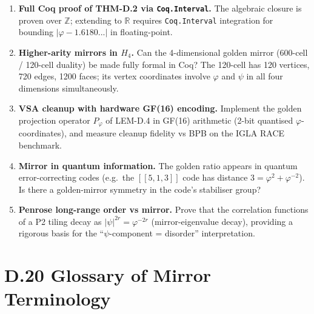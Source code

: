 \begin{enumerate}
  \item \textbf{Full Coq proof of THM-D.2 via \texttt{Coq.Interval}.}
    The algebraic closure is proven over $\mathbb{Z}$; extending to
    $\mathbb{R}$ requires \texttt{Coq.Interval} integration for bounding
    $|\varphi - 1.6180...|$ in floating-point.

  \item \textbf{Higher-arity mirrors in $H_4$.}
    Can the 4-dimensional golden mirror (600-cell / 120-cell duality)
    be made fully formal in Coq?  The 120-cell has 120 vertices, 720 edges,
    1200 faces; its vertex coordinates involve $\varphi$ and $\psi$ in all
    four dimensions simultaneously.

  \item \textbf{VSA cleanup with hardware GF(16) encoding.}
    Implement the golden projection operator $P_\varphi$ of LEM-D.4 in
    GF(16) arithmetic (2-bit quantised $\varphi$-coordinates), and measure
    cleanup fidelity vs BPB on the IGLA RACE benchmark.

  \item \textbf{Mirror in quantum information.}
    The golden ratio appears in quantum error-correcting codes (e.g.\ the
    $[[5,1,3]]$ code has distance $3 = \varphi^2+\varphi^{-2}$).
    Is there a golden-mirror symmetry in the code's stabiliser group?

  \item \textbf{Penrose long-range order vs mirror.}
    Prove that the correlation functions of a P2 tiling decay as
    $|\psi|^{2r} = \varphi^{-2r}$ (mirror-eigenvalue decay), providing a
    rigorous basis for the ``$\psi$-component = disorder'' interpretation.
\end{enumerate}

\section*{D.20  Glossary of Mirror Terminology}


